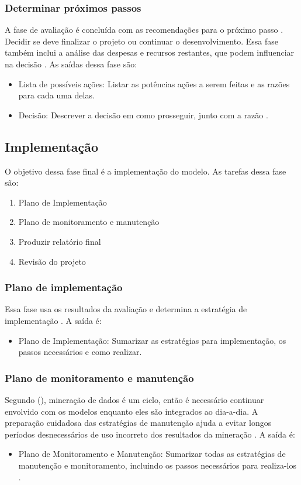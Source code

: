 \subsubsection{Determinar próximos passos}
A fase de avaliação é concluída com as recomendações para o próximo passo \citep[87]{dmfd}. Decidir se deve finalizar o projeto ou continuar o desenvolvimento. Essa fase também inclui a análise das despesas  e recursos restantes, que podem influenciar na decisão \citep[27]{crispmanual}.
As saídas dessa fase são:
\begin{itemize}
    \item Lista de possíveis ações: Listar as potências ações a serem feitas e as razões para cada uma delas. 
    \item Decisão: Descrever a decisão em como prosseguir, junto com a razão \citep[27]{crispmanual}.
\end{itemize}
\subsection{Implementação}
O objetivo dessa fase final é a implementação do modelo.
As tarefas dessa fase são: 
\begin{enumerate}
    \item Plano de Implementação
    \item Plano de monitoramento e manutenção
    \item Produzir relatório final
    \item Revisão do projeto
\end{enumerate}
\subsubsection{Plano de implementação}
Essa fase usa os resultados da avaliação e determina a estratégia de implementação \citep[28]{crispmanual}. 
A saída é:
\begin{itemize}
    \item Plano de Implementação: Sumarizar as estratégias para implementação, os passos necessários e como realizar.
\end{itemize}
\subsubsection{Plano de monitoramento e manutenção}
Segundo \citeauthor{dmfd} (\citeyear[88]{dmfd}), mineração de dados é um ciclo, então é necessário continuar envolvido com os modelos enquanto eles são integrados ao dia-a-dia. A preparação cuidadosa das estratégias de manutenção ajuda a evitar longos períodos desnecessários de uso incorreto dos resultados da mineração \citep[29]{crispmanual}.
A saída é:
\begin{itemize}
    \item Plano de Monitoramento e Manutenção: Sumarizar todas as estratégias de manutenção e monitoramento, incluindo os passos necessários para realiza-los \citep[29]{crispmanual}.
\end{itemize}
